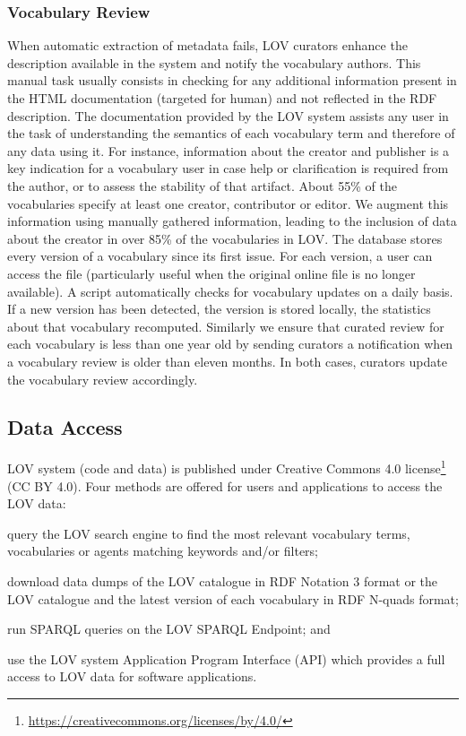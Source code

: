 \documentclass{iosart2c}
\begin{document}
	\subsubsection{Vocabulary Review}
When automatic extraction of metadata fails, LOV curators enhance the description available in the system and notify the vocabulary authors. This manual task usually consists in checking for any additional information present in the HTML documentation (targeted for human) and not reflected in the RDF description. The documentation provided by the LOV system assists any user in the task of understanding the semantics of each vocabulary term and therefore of any data using it. For instance, information about the creator and publisher is a key indication for a vocabulary user in case help or clarification is required from the author, or to assess the stability of that artifact. About 55\% of the vocabularies specify at least one creator, contributor or editor. We augment this information using manually gathered information, leading to the inclusion of data about the creator in over 85\% of the vocabularies in LOV. The database stores every version of a vocabulary since its first issue. For each version, a user can access the file (particularly useful when the original online file is no longer available). A script automatically checks for vocabulary updates on a daily basis. If a new version has been detected, the version is stored locally, the statistics about that vocabulary recomputed. Similarly we ensure that curated review for each vocabulary is less than one year old by sending curators a notification when a vocabulary review is older than eleven months. In both cases, curators update the vocabulary review accordingly. 


\subsection{Data Access}

LOV system (code and data) is published under Creative Commons 4.0 license\footnote{\url{https://creativecommons.org/licenses/by/4.0/}} (CC BY 4.0). Four methods are offered for users and applications to access the LOV data:
		\begin{inparaenum}[1)] 
			\item query the LOV search engine to find the most relevant vocabulary terms, vocabularies or agents matching keywords and/or filters;
			\item download data dumps of the LOV catalogue in RDF Notation 3 format or the LOV catalogue and the latest version of each vocabulary in RDF N-quads format;
			\item run SPARQL queries on the LOV SPARQL Endpoint; and
			\item use the LOV system Application Program Interface (API) which provides a full access to LOV data for software applications.
		\end{inparaenum}
\end{document}
